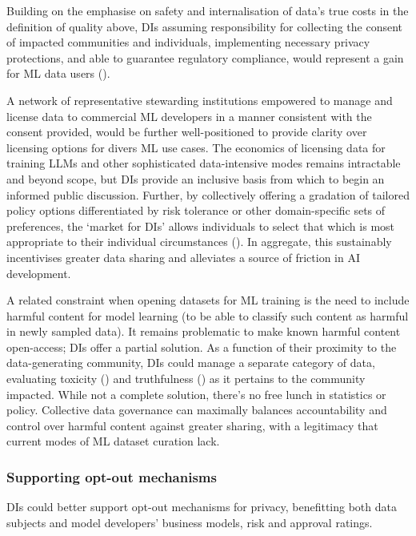 Building on the emphasise on safety and internalisation of data’s true costs in the definition of quality above, DIs assuming responsibility for collecting the consent of impacted communities and individuals, implementing necessary privacy protections, and able to guarantee regulatory compliance, would represent a gain for ML data users (\cite{chan2023ReclaimingDigitalCommons}).

A network of representative stewarding institutions empowered to manage and license data to commercial ML developers in a manner consistent with the consent provided, would be further well-positioned to provide clarity over licensing options for divers ML use cases. The economics of licensing data for training LLMs and other sophisticated data-intensive modes remains intractable and beyond scope, but DIs provide an inclusive basis from which to begin an informed public discussion. Further, by collectively offering a gradation of tailored policy options differentiated by risk tolerance or other domain-specific sets of preferences, the `market for DIs' allows individuals to select that which is most appropriate to their individual circumstances (\cite{2021WhatAreBottomup}). In aggregate, this sustainably incentivises greater data sharing and alleviates a source of friction in AI development.

A related constraint when opening datasets for ML training is the need to include harmful content for model learning (to be able to classify such content as harmful in newly sampled data). It remains problematic to make known harmful content open-access; DIs offer a partial solution. As a function of their proximity to the data-generating community, DIs could manage a separate category of data, evaluating toxicity (\cite{gehman2020RealToxicityPromptsEvaluatingNeural}) and truthfulness (\cite{lin2022TruthfulQAMeasuringHow}) as it pertains to the community impacted. While not a complete solution, there’s no free lunch in statistics or policy. Collective data governance can maximally balances accountability and control over harmful content against greater sharing, with a legitimacy that current modes of ML dataset curation lack.

\subsubsection*{Supporting opt-out mechanisms}

DIs could better support opt-out mechanisms for privacy, benefitting both data subjects and model developers’ business models, risk and approval ratings. 

